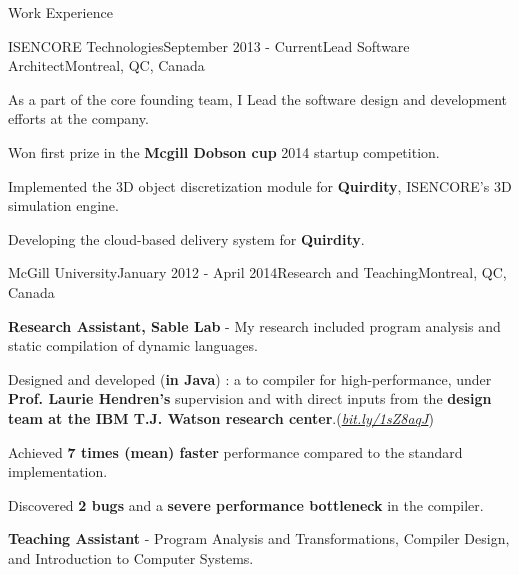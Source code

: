 \documentclass{resume} %
\begin{document}
\begin{rSection}{Work Experience}

\begin{rSubsection}{ISENCORE Technologies}{September 2013 - Current}{Lead
  Software Architect}{Montreal, QC, Canada}
\item As a part of the core founding team, I Lead the software design and development efforts at the company.

\begin{lsubSubsection}
\item Won first prize in the \textbf{Mcgill Dobson cup} 2014 startup competition. 
\item Implemented the 3D object discretization module for \textbf{Quirdity},
  ISENCORE's 3D simulation engine.
\item Developing the cloud-based delivery system for \textbf{Quirdity}.
\end{lsubSubsection}
\end{rSubsection}

\begin{rSubsection}{McGill University}{January 2012 - April 2014}{Research and
Teaching}{Montreal, QC, Canada} 
\item \textbf{Research Assistant, Sable Lab} - My research included program
analysis and static compilation of dynamic languages.

\begin{lsubSubsection}
  \item Designed and developed (\textbf{in Java}) \mixtenx: a {\matlab to
\xten compiler for high-performance}, under \textbf{Prof.
Laurie Hendren's} supervision and with direct inputs from the \textbf{\xten
design team at the IBM T.J. Watson research
center}.(\href{http://bit.ly/1sZ8aqJ}{\em{bit.ly/1sZ8aqJ}})  
 \item Achieved \textbf{7 times (mean) faster} performance compared to the
 standard \matlab implementation.
  \item Discovered \textbf{2 bugs} and a \textbf{severe performance bottleneck}
in the \xten compiler.  
\end{lsubSubsection}
\item \textbf{Teaching Assistant} - Program Analysis and Transformations,
	Compiler Design, and Introduction to Computer Systems.
\end{rSubsection}


\end{rSection}
\end{document}
